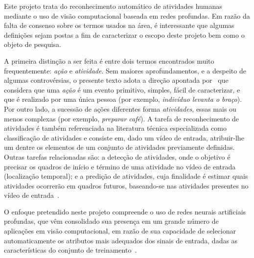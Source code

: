 \nocite{jegham-2020, hussain-2020,yao-2019,kongr-2018,herath-2017}
Este projeto trata do reconhecimento automático de atividades humanas mediante o uso de visão computacional baseada em redes profundas. Em razão da falta de consenso sobre os termos usados na área, é interessante que algumas definições sejam postas a fim de caracterizar o escopo deste projeto bem como o objeto de pesquisa. 

A primeira distinção a ser feita é entre dois termos encontrados muito frequentemente: \emph{ação} e \emph{atividade}. Sem maiores aprofundamentos, e a despeito de algumas controvérsias, o presente texto adota a direção apontada por~\textcite{herath-2017} que considera que uma \emph{ação} é um evento primitivo, simples, fácil de caracterizar, e que é realizado por uma única pessoa (por exemplo, \emph{indivíduo levanta o braço}). Por outro lado, a sucessão de ações diferentes forma \emph{atividades}, essas mais ou menos complexas (por exemplo, \emph{preparar café}).
%
A tarefa de reconhecimento de atividades é também referenciada na literatura técnica especializada como classificação de atividades e consiste em, dado um vídeo de entrada, atribuir-lhe um dentre os elementos de um conjunto de atividades previamente definidas. Outras tarefas relacionadas são: a detecção de atividades, onde o objetivo é precisar os quadros de início e término de uma atividade no vídeo de entrada (localização temporal); e a predição de atividades, cuja finalidade é estimar quais atividades ocorrerão em quadros futuros, baseando-se nas atividades presentes no vídeo de entrada~\parencite{yao-2019}.%

O enfoque pretendido neste projeto compreende o uso de redes neurais artificiais profundas, que vêm consolidado sua presença em um grande número de aplicações em visão computacional, em razão de sua capacidade de selecionar automaticamente os atributos mais adequados dos sinais de entrada, dadas as características do conjunto de treinamento~\parencite{yao-2019}.

